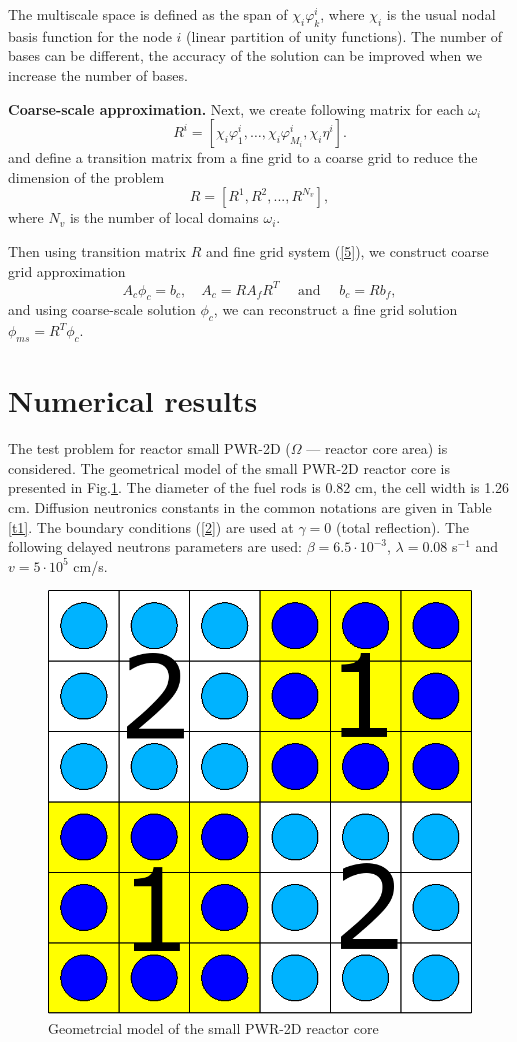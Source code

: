 \documentclass[runningheads]{llncs}
\begin{document}
The multiscale space is defined as the span of $\chi_i \varphi^i_k$, where $\chi_i$ is the usual nodal basis function for the node $i$ (linear partition of unity functions). 
The number of bases can be different, the accuracy of the solution can be improved when we increase the number of bases.

\textbf{Coarse-scale approximation. }
Next, we create following  matrix for each $\omega_i$
\[
R^i = \left[ \chi_i \varphi_1^i, \ldots, \chi_i \varphi_{M_i}^i,  \chi_i \eta^i \right].
\]
and  define a transition matrix from a fine grid to a coarse grid to reduce the dimension of the problem
\[
R = [ R^1, R^2, ..., R^{N_v} ],
\]
where $N_v$ is the number of local domains $\omega_i$.

Then using transition matrix $R$ and fine grid system (\ref{5}), we construct coarse grid approximation
\begin{equation}\label{9}
A_c \phi_c = b_c, \quad 
A_c = R A_f R^T 
\quad \text{ and } \quad 
b_c = R b_f,
\end{equation}  
and using coarse-scale solution $\phi_c$, we can  reconstruct a fine grid solution $\phi_{ms} = R^T \phi_c$.

\section{Numerical results}
The test problem for reactor small PWR-2D ($\Omega$ --- reactor core area) is considered. 
The geometrical model of the small PWR-2D reactor core is presented in Fig.\ref{p3}. 
The diameter of the fuel rods is 0.82 cm, the cell width is 1.26 cm.
Diffusion neutronics constants in the common notations are given in Table \ref{t1}. 
The boundary conditions (\ref{2}) are used at $\gamma = 0$ (total reflection).
The following delayed neutrons parameters are used: $\beta = 6.5 \cdot 10^{−3}$, $\lambda = 0.08$ s$^{-1}$ and $v = 5 \cdot 10^5$ cm/s.

\begin{figure}[h]
  \begin{center}
    \includegraphics[width=0.4\linewidth] {smallpwr.png}
	\caption{Geometrcial model of the small PWR-2D reactor core}
	\label{p3}
  \end{center}
\end{figure} 
\end{document}
